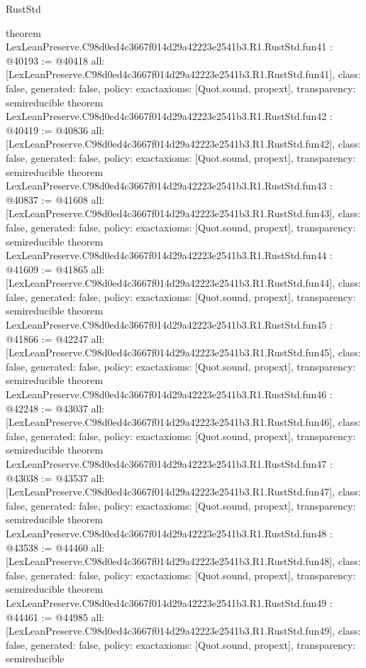 \begin{lexlean}{RustStd}
\begin{coremodule}
{}
theorem LexLeanPreserve.C98d0ed4c3667f014d29a42223e2541b3.R1.RustStd.fun41 : @40193 := @40418 {
  all: [LexLeanPreserve.C98d0ed4c3667f014d29a42223e2541b3.R1.RustStd.fun41],
  class: false,
  generated: false,
  policy: exact{axioms: [Quot.sound, propext]},
  transparency: semireducible
}
theorem LexLeanPreserve.C98d0ed4c3667f014d29a42223e2541b3.R1.RustStd.fun42 : @40419 := @40836 {
  all: [LexLeanPreserve.C98d0ed4c3667f014d29a42223e2541b3.R1.RustStd.fun42],
  class: false,
  generated: false,
  policy: exact{axioms: [Quot.sound, propext]},
  transparency: semireducible
}
theorem LexLeanPreserve.C98d0ed4c3667f014d29a42223e2541b3.R1.RustStd.fun43 : @40837 := @41608 {
  all: [LexLeanPreserve.C98d0ed4c3667f014d29a42223e2541b3.R1.RustStd.fun43],
  class: false,
  generated: false,
  policy: exact{axioms: [Quot.sound, propext]},
  transparency: semireducible
}
theorem LexLeanPreserve.C98d0ed4c3667f014d29a42223e2541b3.R1.RustStd.fun44 : @41609 := @41865 {
  all: [LexLeanPreserve.C98d0ed4c3667f014d29a42223e2541b3.R1.RustStd.fun44],
  class: false,
  generated: false,
  policy: exact{axioms: [Quot.sound, propext]},
  transparency: semireducible
}
theorem LexLeanPreserve.C98d0ed4c3667f014d29a42223e2541b3.R1.RustStd.fun45 : @41866 := @42247 {
  all: [LexLeanPreserve.C98d0ed4c3667f014d29a42223e2541b3.R1.RustStd.fun45],
  class: false,
  generated: false,
  policy: exact{axioms: [Quot.sound, propext]},
  transparency: semireducible
}
theorem LexLeanPreserve.C98d0ed4c3667f014d29a42223e2541b3.R1.RustStd.fun46 : @42248 := @43037 {
  all: [LexLeanPreserve.C98d0ed4c3667f014d29a42223e2541b3.R1.RustStd.fun46],
  class: false,
  generated: false,
  policy: exact{axioms: [Quot.sound, propext]},
  transparency: semireducible
}
theorem LexLeanPreserve.C98d0ed4c3667f014d29a42223e2541b3.R1.RustStd.fun47 : @43038 := @43537 {
  all: [LexLeanPreserve.C98d0ed4c3667f014d29a42223e2541b3.R1.RustStd.fun47],
  class: false,
  generated: false,
  policy: exact{axioms: [Quot.sound, propext]},
  transparency: semireducible
}
theorem LexLeanPreserve.C98d0ed4c3667f014d29a42223e2541b3.R1.RustStd.fun48 : @43538 := @44460 {
  all: [LexLeanPreserve.C98d0ed4c3667f014d29a42223e2541b3.R1.RustStd.fun48],
  class: false,
  generated: false,
  policy: exact{axioms: [Quot.sound, propext]},
  transparency: semireducible
}
theorem LexLeanPreserve.C98d0ed4c3667f014d29a42223e2541b3.R1.RustStd.fun49 : @44461 := @44985 {
  all: [LexLeanPreserve.C98d0ed4c3667f014d29a42223e2541b3.R1.RustStd.fun49],
  class: false,
  generated: false,
  policy: exact{axioms: [Quot.sound, propext]},
  transparency: semireducible
}
\end{coremodule}
\end{lexlean}
